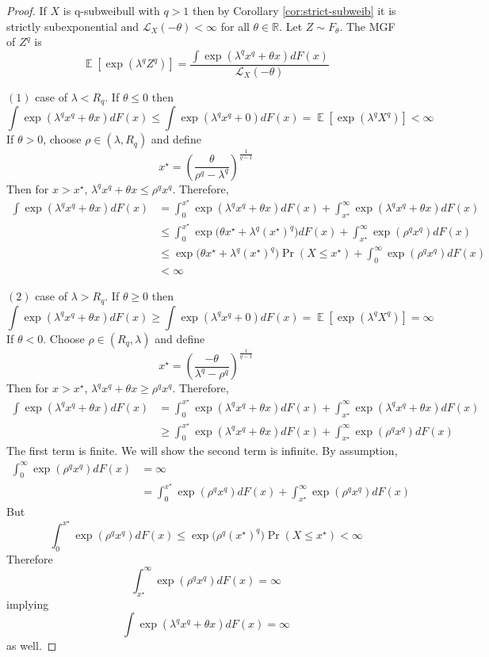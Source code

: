 \documentclass[10pt,a4paper]{amsart}
\DeclareMathOperator{\E}{\mathbb{E}}
\begin{document}
\begin{proof}
If $X$ is q-subweibull with $q>1$ then by Corollary \ref{cor:strict-subweib} it is strictly subexponential and $\mathcal{L}_X(-\theta)<\infty$ for all $\theta\in\mathbb{R}$. Let $Z\sim F_\theta$. The MGF of $Z^q$ is
\[\E[\exp(\lambda^q Z^q)] = \frac{\int \exp(\lambda^q x^q + \theta x) dF(x)}{\mathcal{L}_X(-\theta)}\]

$(1)$ case of $\lambda<R_q$. If $\theta\leq 0$ then 
\[\int \exp(\lambda^q x^q + \theta x) dF(x)\leq \int \exp(\lambda^q x^q + 0) dF(x) = \E[\exp(\lambda^q X^q)]<\infty\]
If $\theta>0$, choose $\rho\in (\lambda,R_q)$ and define
\[x^\star = \left(\frac{\theta}{\rho^q-\lambda^q}\right)^{\frac{1}{q-1}}\]
Then for $x>x^\star$, $\lambda^q x^q + \theta x\leq \rho^q x^q$. Therefore,
\begin{align*}
\int \exp(\lambda^q x^q + \theta x) dF(x) &= \int_0^{x^\star} \exp(\lambda^q x^q + \theta x) dF(x) + \int_{x^\star}^\infty \exp(\lambda^q x^q + \theta x) dF(x)\\
&\leq \int_0^{x^\star}\exp\big(\theta x^\star + \lambda^q (x^\star)^q\big)dF(x) + \int_{x^\star}^\infty \exp(\rho^q x^q) dF(x)\\
&\leq \exp\big(\theta x^\star + \lambda^q (x^\star)^q\big) \Pr(X\leq x^\star) + \int_0^\infty \exp(\rho^q x^q) dF(x)\\
&<\infty
\end{align*}

$(2)$ case of $\lambda>R_q$. If $\theta\geq 0$ then
\[\int \exp(\lambda^q x^q + \theta x) dF(x)\geq \int \exp(\lambda^q x^q + 0) dF(x) = \E[\exp(\lambda^q X^q)] = \infty\]
If $\theta<0$. Choose $\rho\in (R_q,\lambda)$ and define
\[x^\star = \left(\frac{-\theta}{\lambda^q-\rho^q}\right)^{\frac{1}{q-1}}\]
Then for $x>x^\star$, $\lambda^q x^q + \theta x\geq \rho^q x^q$. Therefore,
\begin{align*}
\int \exp(\lambda^q x^q + \theta x) dF(x) &= \int_0^{x^\star} \exp(\lambda^q x^q + \theta x) dF(x) + \int_{x^\star}^\infty \exp(\lambda^q x^q + \theta x) dF(x)\\
&\geq \int_0^{x^\star}\exp(\lambda^q x^q + \theta x)dF(x) + \int_{x^\star}^\infty \exp(\rho^q x^q) dF(x)
\end{align*}
The first term is finite. We will show the second term is infinite. By assumption,
\begin{align*}
\int_0^\infty \exp(\rho^q x^q) dF(x) &= \infty\\
&= \int_0^{x^\star} \exp(\rho^q x^q) dF(x)+\int_{x^\star}^\infty \exp(\rho^q x^q) dF(x)
\end{align*}
But 
\[\int_0^{x^\star} \exp(\rho^q x^q) dF(x)\leq \exp\big(\rho^q (x^\star)^q\big)\Pr(X\leq x^\star)<\infty\]
Therefore
\[\int_{x^\star}^\infty \exp(\rho^q x^q) dF(x) = \infty\]
implying
\[\int \exp(\lambda^q x^q + \theta x) dF(x)=\infty\]
as well.


\end{proof}
\end{document}
